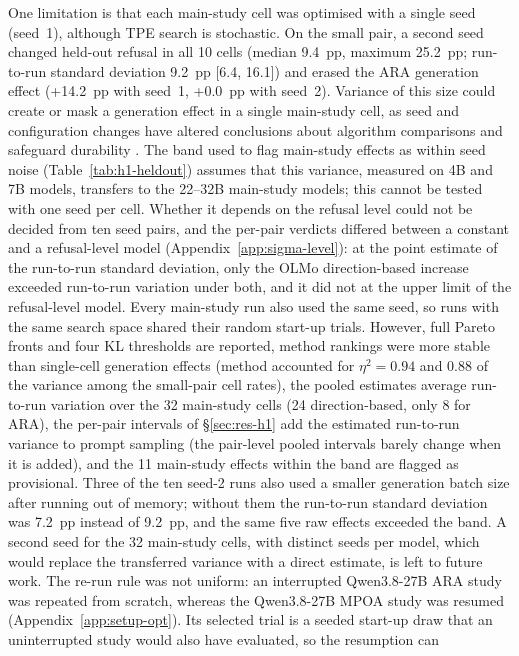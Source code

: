 One limitation is that each main-study cell was optimised with a single seed
(seed~1), although TPE search is stochastic. On the small pair, a second seed
changed held-out refusal in all 10 cells (median 9.4~pp, maximum 25.2~pp;
run-to-run standard deviation 9.2~pp [6.4, 16.1]) and
erased the ARA generation effect (+14.2~pp with seed~1, +0.0~pp with
seed~2). Variance of this size could create or mask a generation effect in a
single main-study cell, as seed and configuration changes have altered
conclusions about algorithm comparisons \cite{bouthillier2021accounting} and
safeguard durability \cite{qi2025durability}. The band used to flag
main-study effects as within seed noise (Table~\ref{tab:h1-heldout}) assumes
that this variance, measured on 4B and 7B models, transfers to the 22--32B
main-study models; this cannot be tested with one seed per cell. Whether it
depends on the refusal level could not be decided from ten seed pairs, and the
per-pair verdicts differed between a constant and a refusal-level model
(Appendix~\ref{app:sigma-level}): at the point estimate of the run-to-run
standard deviation, only the OLMo direction-based increase exceeded run-to-run
variation under both, and it did not at the upper limit of the refusal-level
model. Every main-study run also used the
same seed, so runs with the same search space shared their random start-up
trials. However, full Pareto fronts and
four KL thresholds are reported, method rankings were more stable than
single-cell generation effects (method accounted for $\eta^2=0.94$ and 0.88 of
the variance among the small-pair cell rates), the pooled estimates average
run-to-run variation over the 32 main-study cells (24 direction-based, only 8
for ARA), the per-pair intervals of \S\ref{sec:res-h1} add the estimated
run-to-run variance to prompt sampling (the pair-level pooled intervals barely
change when it is added), and the 11 main-study
effects within the band are flagged as provisional. Three of the ten seed-2
runs also used a smaller generation batch size after running out of memory;
without them the run-to-run standard deviation was 7.2~pp instead of 9.2~pp,
and the same five raw effects exceeded the band. A second seed for the 32
main-study cells, with distinct seeds per model, which would replace the
transferred variance with a direct estimate, is left to future work. The
re-run rule was not uniform: an interrupted Qwen3.8-27B ARA study was repeated
from scratch, whereas the Qwen3.8-27B MPOA study was resumed
(Appendix~\ref{app:setup-opt}). Its selected trial is a seeded start-up draw
that an uninterrupted study would also have evaluated, so the resumption can
